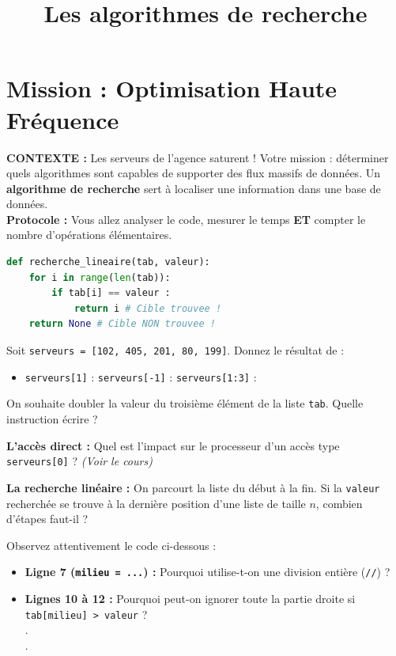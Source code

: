 \documentclass[12pt,a4paper]{report}
\title{Les algorithmes de recherche}
\date{}
\begin{document}
\chapter*{ Mission : Optimisation Haute Fréquence}

\begin{Comprendre}
\textbf{CONTEXTE :}  Les serveurs de l'agence saturent ! Votre mission : déterminer quels algorithmes sont capables de supporter des flux massifs de données. Un \textbf{algorithme de recherche} sert à localiser une information dans une base de données.
    \\ \textbf{Protocole :} Vous allez analyser le code, mesurer le temps \textbf{ET} compter le nombre d'opérations élémentaires. 
\end{Comprendre}

\begin{lstlisting}[language=Python]
def recherche_lineaire(tab, valeur):
    for i in range(len(tab)):
        if tab[i] == valeur :
            return i # Cible trouvee !
    return None # Cible NON trouvee !
\end{lstlisting}

\begin{Exercise}[title={Check-up technique (Rappels de base) }]
    \Question Soit \texttt{serveurs = [102, 405, 201, 80, 199]}. Donnez le résultat de :
    \begin{itemize}
        \item \texttt{serveurs[1]} : \dotfill \quad \texttt{serveurs[-1]} : \dotfill \quad \texttt{serveurs[1:3]} : \dotfill
    \end{itemize}

    \Question On souhaite doubler la valeur du troisième élément de la liste \texttt{tab}. Quelle instruction écrire ? \dotfill

    \Question \textbf{L'accès direct :} Quel est l'impact sur le processeur d'un accès type \texttt{serveurs[0]} ? \textit{(Voir le cours)} \dotfill
    
    \Question \textbf{La recherche linéaire :} On parcourt la liste du début à la fin. Si la \texttt{valeur} recherchée se trouve à la dernière position d'une liste de taille $n$, combien d'étapes faut-il ? \dotfill
\end{Exercise}

\begin{Exercise}[title={Analyse du Code }]
    \Question Observez attentivement le code ci-dessous :
    \begin{itemize}
        \item \textbf{Ligne 7 (\texttt{milieu = ...}) :} Pourquoi utilise-t-on une division entière (\texttt{//}) ? \dotfill
        \item \textbf{Lignes 10 à 12 :} Pourquoi peut-on ignorer toute la partie droite si \texttt{tab[milieu] > valeur} ? \\
        .\dotfill\\
        .\dotfill
    \end{itemize}
\end{Exercise}
\end{document}
